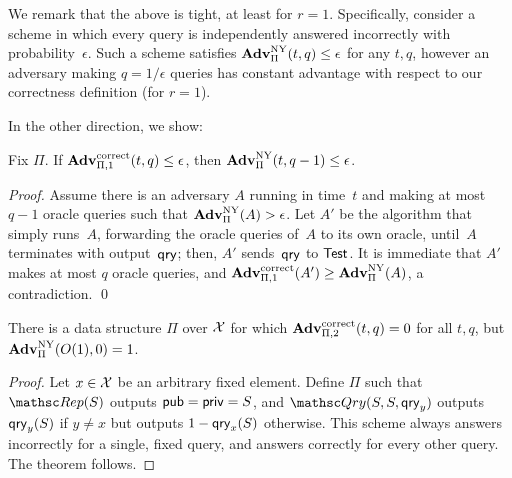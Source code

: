 We remark that the above is tight, at least for $r=1$. Specifically, consider a scheme
in which every query is independently
answered incorrectly with probability~$\epsilon$. Such a
scheme satisfies $\mathrm{\mathbf{Adv}}^{\mathrm{NY}}_{\Pi}(t,q) \leq \epsilon$ for any $t, q$,
however an adversary making $q=1/\epsilon$ queries has constant advantage
with respect to our correctness definition (for $r=1$).

In the other direction, we show:

\begin{theorem}
Fix $\Pi$. If $\mathrm{\mathbf{Adv}}^{\mathrm{correct}}_{\Pi,1}(t,q) \leq \epsilon$, then
$\mathrm{\mathbf{Adv}}^{\mathrm{NY}}_{\Pi}(t,q-1) \leq \epsilon$.
\end{theorem}
\begin{proof}
Assume
there is an adversary $A$ running in time~$t$
and making at most $q-1$ oracle queries such that
$\mathrm{\mathbf{Adv}}^{\mathrm{NY}}_{\Pi}(A) > \epsilon$.
Let $A'$ be the algorithm that simply
runs~$A$, forwarding the oracle queries of~$A$ to its own oracle, until~$A$ terminates
with output~$\mathsf{qry}$; then, $A'$ sends~$\mathsf{qry}$ to $\mathsf{Test}$. It is immediate that $A'$ makes at most $q$ oracle queries, and
$\mathrm{\mathbf{Adv}}^{\mathrm{correct}}_{\Pi,1}(A') \geq \mathrm{\mathbf{Adv}}^{\mathrm{NY}}_{\Pi}(A)$, a contradiction. \hfill\qed
\end{proof}

\begin{theorem}
There is a data structure $\Pi$ over ${\cal X}$
for which $\mathrm{\mathbf{Adv}}^{\mathrm{correct}}_{\Pi,2}(t,q)=0$ for all $t, q$,
but $\mathrm{\mathbf{Adv}}^{\mathrm{NY}}_{\Pi}(O(1),0) = 1$.
\end{theorem}
\begin{proof}
Let $x \in {\cal X}$ be
an arbitrary fixed element.
Define $\Pi$ such that $\Rep(S)$ outputs
${\sf pub}={\sf priv}=S$, and
$\Qry(S, S, \qry_y)$ outputs $\mathsf{qry}_y(S)$ if $y \neq x$ but outputs $1-\mathsf{qry}_x(S)$ otherwise.
This scheme always answers incorrectly for a single, fixed query, and answers
correctly for every other query. The theorem follows.
\end{proof}


